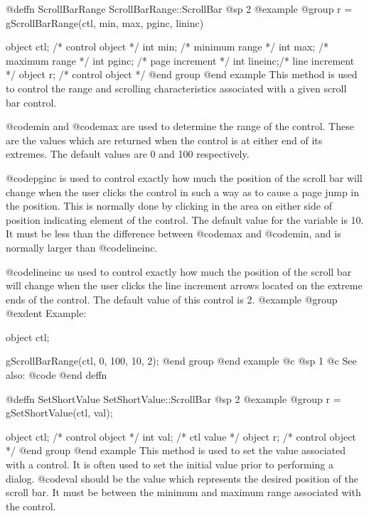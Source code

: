 {@deffn {ScrollBarRange} ScrollBarRange::ScrollBar
@sp 2
@example
@group
r = gScrollBarRange(ctl, min, max, pginc, lininc)

object  ctl;    /*  control object  */
int     min;    /*  minimum range   */
int     max;    /*  maximum range   */
int     pginc;  /*  page increment  */
int     lineinc;/*  line increment  */
object  r;      /*  control object  */
@end group
@end example
This method is used to control the range and scrolling characteristics
associated with a given scroll bar control.

@code{min} and @code{max} are used to determine the range of the
control.  These are the values which are returned when the control
is at either end of its extremes.  The default values are 0 and
100 respectively.

@code{pginc} is used to control exactly how much the position of the
scroll bar will change when the user clicks the control in such a way
as to cause a page jump in the position.  This is normally done by
clicking in the area on either side of position indicating element of the
control.  The default value for the variable is 10.  It must be less than
the difference between @code{max} and @code{min}, and is normally larger
than @code{lineinc}.

@code{lineinc} us used to control exactly how much the position of the
scroll bar will change when the user clicks the line increment arrows
located on the extreme ends of the control.  The default value of this
control is 2.
@example
@group
@exdent Example:

object  ctl;

gScrollBarRange(ctl, 0, 100, 10, 2);
@end group
@end example
@c @sp 1
@c See also:  @code{}
@end deffn














@deffn {SetShortValue} SetShortValue::ScrollBar
@sp 2
@example
@group
r = gSetShortValue(ctl, val);

object  ctl;    /*  control object  */
int     val;    /*  ctl value       */
object  r;      /*  control object  */
@end group
@end example
This method is used to set the value associated with a control.  It is
often used to set the initial value prior to performing a dialog.
@code{val} should be the value which represents the desired
position of the scroll bar.  It must be between the minimum and
maximum range associated with the control.

}
